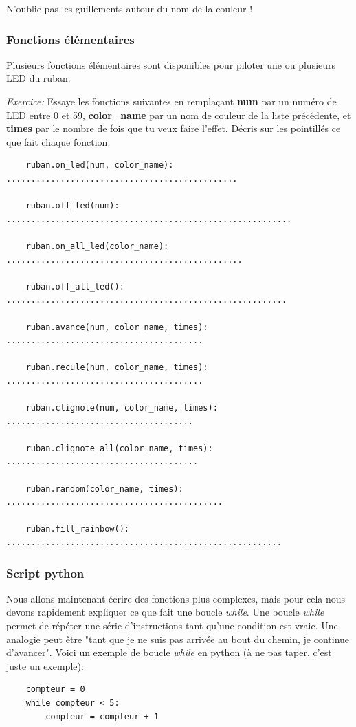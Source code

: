 N'oublie pas les guillements autour du nom de la couleur !

\subsubsection{Fonctions élémentaires}

Plusieurs fonctions élémentaires sont disponibles pour piloter une ou plusieurs LED du ruban. \par

\textit{Exercice:} Essaye les fonctions suivantes en remplaçant \textbf{num} par un numéro de LED entre 0 et 59,
\textbf{color\_name} par un nom de couleur de la liste précédente, et \textbf{times} par le nombre de fois
que tu veux faire l'effet.
Décris sur les pointillés ce que fait chaque fonction.

\color{blue}\begin{verbatim}
    ruban.on_led(num, color_name): ............................................... 

    ruban.off_led(num): ..........................................................

    ruban.on_all_led(color_name): ................................................

    ruban.off_all_led(): .........................................................

    ruban.avance(num, color_name, times): ........................................

    ruban.recule(num, color_name, times): ........................................

    ruban.clignote(num, color_name, times): ......................................

    ruban.clignote_all(color_name, times): .......................................

    ruban.random(color_name, times): ............................................

    ruban.fill_rainbow(): ........................................................
\end{verbatim}
\color{black}

\subsubsection{Script python}

Nous allons maintenant écrire des fonctions plus complexes, mais pour cela nous devons rapidement expliquer
ce que fait une boucle \textit{while}.
Une boucle \textit{while} permet de répéter une série d'instructions tant qu'une condition est vraie.
Une analogie peut être "tant que je ne suis pas arrivée au bout du chemin, je continue d'avancer".
Voici un exemple de boucle \textit{while} en python (à ne pas taper, c'est juste un exemple):
\color{blue}
\begin{verbatim}
    compteur = 0
    while compteur < 5:
        compteur = compteur + 1
\end{verbatim}
\color{black}

